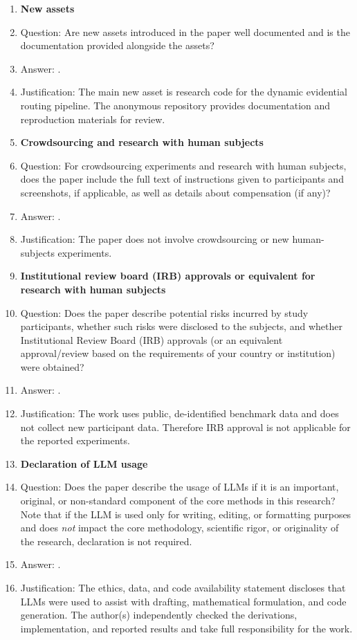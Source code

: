 \begin{enumerate}
\item {\bf New assets}
    \item[] Question: Are new assets introduced in the paper well documented and is the documentation provided alongside the assets?
    \item[] Answer: \answerYes{}.
    \item[] Justification: The main new asset is research code for the dynamic evidential routing pipeline. The anonymous repository provides documentation and reproduction materials for review.

\item {\bf Crowdsourcing and research with human subjects}
    \item[] Question: For crowdsourcing experiments and research with human subjects, does the paper include the full text of instructions given to participants and screenshots, if applicable, as well as details about compensation (if any)?
    \item[] Answer: \answerNA{}.
    \item[] Justification: The paper does not involve crowdsourcing or new human-subjects experiments.

\item {\bf Institutional review board (IRB) approvals or equivalent for research with human subjects}
    \item[] Question: Does the paper describe potential risks incurred by study participants, whether such risks were disclosed to the subjects, and whether Institutional Review Board (IRB) approvals (or an equivalent approval/review based on the requirements of your country or institution) were obtained?
    \item[] Answer: \answerNA{}.
    \item[] Justification: The work uses public, de-identified benchmark data and does not collect new participant data. Therefore IRB approval is not applicable for the reported experiments.

\item {\bf Declaration of LLM usage}
    \item[] Question: Does the paper describe the usage of LLMs if it is an important, original, or non-standard component of the core methods in this research? Note that if the LLM is used only for writing, editing, or formatting purposes and does \emph{not} impact the core methodology, scientific rigor, or originality of the research, declaration is not required.
    \item[] Answer: \answerYes{}.
    \item[] Justification: The ethics, data, and code availability statement discloses that LLMs were used to assist with drafting, mathematical formulation, and code generation. The author(s) independently checked the derivations, implementation, and reported results and take full responsibility for the work.

\end{enumerate}
